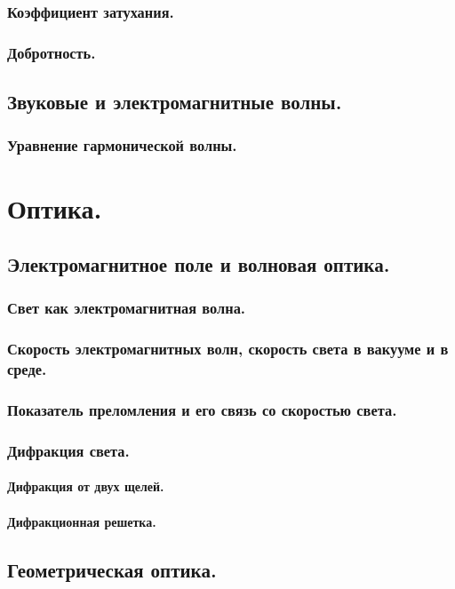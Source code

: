 \documentclass{article}
\begin{document}
        \subsubsection{Коэффициент затухания.}
        \subsubsection{Добротность.}
    \subsection{Звуковые и электромагнитные волны.}
        \subsubsection{Уравнение гармонической волны.}
\section{Оптика.}
    \subsection{Электромагнитное поле и волновая оптика.}
        \subsubsection{Свет как электромагнитная волна.}
        \subsubsection{Скорость электромагнитных волн, скорость света в вакууме и в среде.}
        \subsubsection{Показатель преломления и его связь со скоростью света.}
        \subsubsection{Дифракция света.}
            \paragraph{Дифракция от двух щелей.}
            \paragraph{Дифракционная решетка.}
    \subsection{Геометрическая оптика.}
\end{document}
